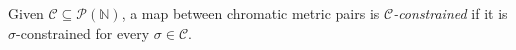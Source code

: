 
Given $\mathcal C\subseteq\mathcal P(\mathbb N)$, a map between chromatic metric pairs is \emph{$\mathcal C$-constrained} if it is $\sigma$-constrained for every $\sigma\in\mathcal C$.
